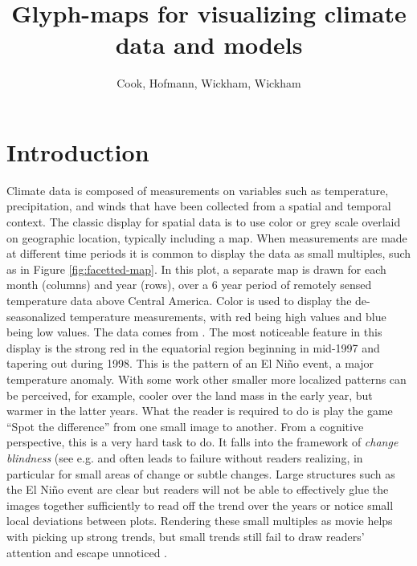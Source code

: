 \documentclass[oneside]{article}
\begin{document}
\title{Glyph-maps for visualizing climate data and models}
\author{Cook, Hofmann, Wickham, Wickham}


%
%
\maketitle

\section{Introduction}

Climate data is composed of measurements on variables such as temperature, precipitation, and winds that have been collected from a spatial and temporal context. The classic display for spatial data is to use color or grey scale overlaid on geographic location, typically including a map. When measurements are made at different time periods it is common to display the data as small multiples, such as in Figure \ref{fig:facetted-map}. In this plot, a separate map is drawn for each month (columns) and year (rows), over a 6 year period of remotely sensed temperature data above Central America. Color is used to display the de-seasonalized temperature measurements, with red being high values and blue being low values. The data comes from \citet{murrell:2010}. The most noticeable feature in this display is the strong red in the equatorial region beginning in mid-1997 and tapering out during 1998. This is the pattern of an El Ni\~no event, a major temperature anomaly. With some work other smaller more localized patterns can be perceived, for example, cooler over the land mass in the early year, but warmer in the latter years. What the reader is required to do is play the game ``Spot the difference'' from one small image to another. From a cognitive perspective, this is a very hard task to do. It falls into the framework of {\it change blindness} (see e.g. \citet{healey:2011} and often leads to failure without readers realizing, in particular for small areas of change or subtle changes.  Large structures such as the El Ni\~no event are clear but readers will not be able to effectively glue the images together sufficiently to read off the trend over the years or notice small local deviations between plots. Rendering these small multiples as movie helps with picking up strong trends, but small trends still fail to draw readers' attention and escape unnoticed \citep{simons:gradual}.
\end{document}
